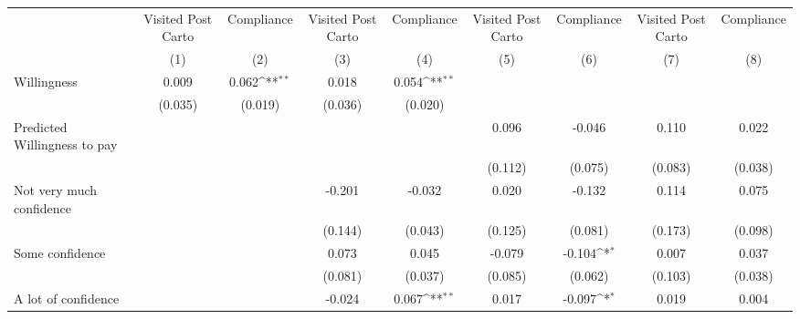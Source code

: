 {
\def\sym#1{\ifmmode^{#1}\else\(^{#1}\)\fi}
\begin{tabular}{l*{8}{c}}
\hline\hline
                &\multicolumn{1}{c}{Visited Post Carto}&\multicolumn{1}{c}{Compliance}&\multicolumn{1}{c}{Visited Post Carto}&\multicolumn{1}{c}{Compliance}&\multicolumn{1}{c}{Visited Post Carto}&\multicolumn{1}{c}{Compliance}&\multicolumn{1}{c}{Visited Post Carto}&\multicolumn{1}{c}{Compliance}\\
                &\multicolumn{1}{c}{(1)}         &\multicolumn{1}{c}{(2)}         &\multicolumn{1}{c}{(3)}         &\multicolumn{1}{c}{(4)}         &\multicolumn{1}{c}{(5)}         &\multicolumn{1}{c}{(6)}         &\multicolumn{1}{c}{(7)}         &\multicolumn{1}{c}{(8)}         \\
\hline
Willingness     &    0.009         &    0.062\sym{**} &    0.018         &    0.054\sym{**} &                  &                  &                  &                  \\
                &  (0.035)         &  (0.019)         &  (0.036)         &  (0.020)         &                  &                  &                  &                  \\
Predicted Willingness to pay&                  &                  &                  &                  &    0.096         &   -0.046         &    0.110         &    0.022         \\
                &                  &                  &                  &                  &  (0.112)         &  (0.075)         &  (0.083)         &  (0.038)         \\
Not very much confidence&                  &                  &   -0.201         &   -0.032         &    0.020         &   -0.132         &    0.114         &    0.075         \\
                &                  &                  &  (0.144)         &  (0.043)         &  (0.125)         &  (0.081)         &  (0.173)         &  (0.098)         \\
Some confidence &                  &                  &    0.073         &    0.045         &   -0.079         &   -0.104\sym{*}  &    0.007         &    0.037         \\
                &                  &                  &  (0.081)         &  (0.037)         &  (0.085)         &  (0.062)         &  (0.103)         &  (0.038)         \\
A lot of confidence&                  &                  &   -0.024         &    0.067\sym{**} &    0.017         &   -0.097\sym{*}  &    0.019         &    0.004         \\

\end{tabular}}
